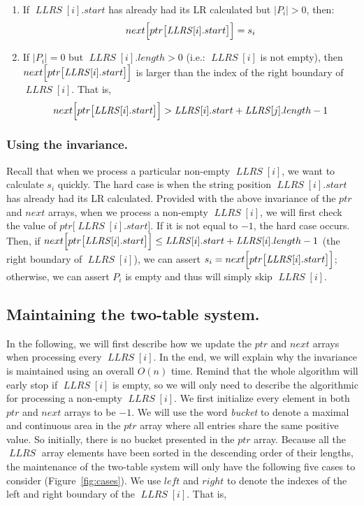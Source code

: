 \documentclass[preprint]{elsarticle}
\DeclareMathOperator{\llrs}{\mathit{LLRS}}
\begin{document}
\begin{enumerate}
\item If $\llrs[i].start$ has already had its LR calculated but $|P_i|>0$, then:
  $$next\Bigl[ptr\bigl[\llrs[i].start\bigr]\Bigr]  =  s_i$$


\item If $|P_i|=0$ but $\llrs[i].length > 0$ (i.e.: $\llrs[i]$ is not
  empty), then $next\Bigl[ptr\bigl[\llrs[i].start\bigr]\Bigr]$ is
  larger than the index of the right boundary of $\llrs[i]$. That is,
  $$next\Bigl[ptr\bigl[\llrs[i].start\bigr]\Bigr]  > 
  \llrs[i].start + \llrs[j].length-1$$ 
\end{enumerate}


\subsubsection{Using the invariance.}
Recall that when we process a particular non-empty $\llrs[i]$, we want
to calculate $s_i$ quickly. The hard case is when the string position
$\llrs[i].start$ has already had its LR calculated.  Provided with the
above invariance of the $ptr$ and $next$ arrays, when we process a non-empty $\llrs[i]$, we will first check the
value of $ptr\bigl[\llrs[i].start\bigr]$. If it is not equal to $-1$,
the hard case occurs. Then, if
$next\Bigl[ptr\bigl[\llrs[i].start\bigr]\Bigr] \leq \llrs[i].start +
\llrs[i].length -1$ (the right boundary of $\llrs[i]$), we can assert
$s_i =next\Bigl[ptr\bigl[\llrs[i].start\bigr]\Bigr]$; otherwise, we
can assert $P_i$ is empty and thus will simply skip $\llrs[i]$.



\subsection{Maintaining the two-table system.}
\label{subsec:maintain}
In the following, we will first describe how we update the $ptr$ and
$next$ arrays when processing every $\llrs[i]$. In the end, we will
explain why the invariance is maintained using an overall $O(n)$ time.
Remind that the whole algorithm will early stop if $\llrs[i]$ is
empty, so we will only need to describe the algorithmic for
processing a non-empty $\llrs[i]$.  We first initialize every element
in both $ptr$ and $next$ arrays to be $-1$.  We will use the word
\emph{bucket} to denote a maximal and continuous area in the $ptr$
array where all entries share the same positive value.  So initially,
there is no bucket presented in the $ptr$ array.  Because all the
$\llrs$ array elements have been sorted in the descending order of
their lengths, the maintenance of the two-table system will only have
the following five cases to consider (Figure~\ref{fig:cases}).  We use
$left$ and $right$ to denote the indexes of the left and right
boundary of the $\llrs[i]$. That is,
\end{document}
